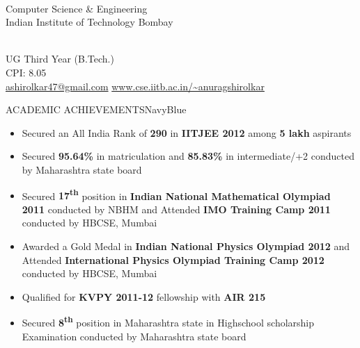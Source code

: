 \documentclass[11pt]{book} %
\begin{document}
\begin{minipage}[t]{10cm}
\flushleft
{}\\
\vspace{2mm}
Computer Science \& Engineering\\
Indian Institute of Technology Bombay
\end{minipage}
\hfill
\begin{minipage}[t]{7cm}
\\
UG Third Year (B.Tech.)\\
CPI: 8.05\\
\href{mailto:ashirolkar47@gmail.com}{ashirolkar47@gmail.com}
\href{http://www.cse.iitb.ac.in/~anuragshirolkar}{www.cse.iitb.ac.in/\textasciitilde anuragshirolkar}
\end{minipage}



\begin{ressection}{ACADEMIC ACHIEVEMENTS}{NavyBlue}

\begin{itemize}
\itemsep-0.0em
\item Secured an All India Rank of {\bf 290} in {\bf IITJEE 2012} among {\bf 5 lakh} aspirants
\item Secured {\bf 95.64\%} in matriculation and {\bf 85.83\%} in intermediate/+2 conducted by Maharashtra state board
\item Secured {\bf 17\textsuperscript{th}} position in {\bf Indian National Mathematical Olympiad 2011} conducted by NBHM and Attended {\bf IMO Training Camp 2011} conducted by HBCSE, Mumbai
\item Awarded a Gold Medal in {\bf Indian National Physics Olympiad 2012} and Attended {\bf International Physics Olympiad Training Camp 2012} conducted by HBCSE, Mumbai
\item Qualified for {\bf KVPY 2011-12} fellowship with {\bf AIR 215}
\item Secured {\bf 8\textsuperscript{th}} position in Maharashtra state in Highschool scholarship Examination conducted by Maharashtra 
state board
\end{itemize}

\end{ressection}
\end{document}
